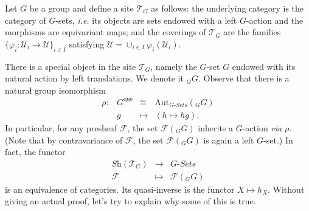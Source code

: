 \noindent
Let $G$ be a group and define a site $\mathcal{T}_G$ as follows: the underlying 
category is the category of $G$-sets, {\it i.e.} its objects are sets endowed 
with a left $G$-action and the morphisms are equivariant maps; and the 
coverings of $\mathcal{T}_G$ are the families $\{\varphi_i : \mathcal{U}_i \to 
\mathcal{U} \}_{i\in I}$ satisfying $\mathcal{U} = \cup_{i\in I} \varphi_i 
(\mathcal{U}_i)$. 

\medskip\noindent
There is a special object in the site $\mathcal{T}_G$, namely the $G$-set $G$ 
endowed with its natural action by left translations. We denote it ${}_G G$. 
Observe that there is a natural group isomorphism
$$
\begin{array}{rccl}
\rho: & G^{opp} & \cong & \text{Aut}_{G\textit{-Sets}}({}_G G) \\
& g & \longmapsto & (h \mapsto hg).
\end{array}
$$
In particular, for any presheaf $\mathcal{F}$, the set $\mathcal{F}({}_G G)$  
inherits a $G$-action \emph{via} $\rho$. (Note that by contravariance of 
$\mathcal{F}$, the set $\mathcal{F}({}_G G)$ is again a left $G$-set.) In fact, 
the functor 
$$
\begin{array}{rcl}
\textit{Sh}(\mathcal{T}_G) & \longrightarrow & G\textit{-Sets} \\
\mathcal{F} & \longmapsto & \mathcal{F}({}_G G)
\end{array}
$$
is an equivalence of categories. Its quasi-inverse is the functor $X \mapsto 
h_X$. Without giving an actual proof, let's try to explain why some of this is 
true.
